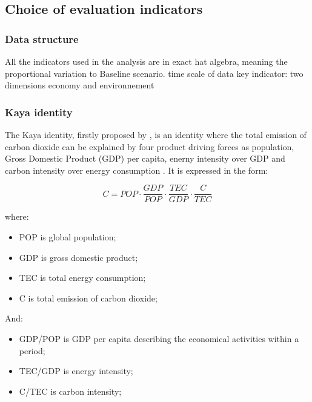 \documentclass[
]{article}
\providecommand{\tightlist}{%
  \setlength{\itemsep}{0pt}\setlength{\parskip}{0pt}}
\begin{document}
\hypertarget{choice-of-evaluation-indicators}{%
\subsection{Choice of evaluation
indicators}\label{choice-of-evaluation-indicators}}

\hypertarget{data-structure}{%
\subsubsection{Data structure}\label{data-structure}}

All the indicators used in the analysis are in exact hat algebra,
meaning the proportional variation to Baseline scenario. time scale of
data key indicator: two dimensions economy and environnement

\hypertarget{kaya-identity}{%
\subsubsection{Kaya identity}\label{kaya-identity}}

The Kaya identity, firstly proposed by \autocite{kaya1989}, is an
identity where the total emission of carbon dioxide can be explained by
four product driving forces as population, Gross Domestic Product (GDP)
per capita, enerny intensity over GDP and carbon intensity over energy
consumption \autocite{kayaide2021}. It is expressed in the form:

\[ C = POP \cdot \frac{GDP}{POP} \cdot \frac{TEC}{GDP} \cdot \frac{C}{TEC} \tag{1}\]

where:

\begin{itemize}
\tightlist
\item
  POP is global population;
\item
  GDP is gross domestic product;
\item
  TEC is total energy consumption;
\item
  C is total emission of carbon dioxide;
\end{itemize}

And:

\begin{itemize}
\tightlist
\item
  GDP/POP is GDP per capita describing the economical activities within
  a period;
\item
  TEC/GDP is energy intensity;
\item
  C/TEC is carbon intensity;
\end{itemize}
\end{document}
